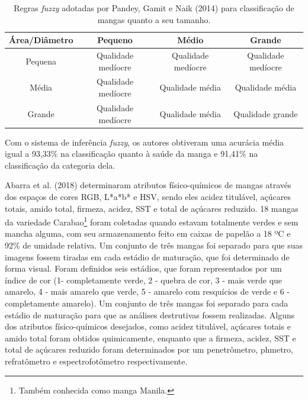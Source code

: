 \begin{center}
	\begin{table}[!htb]
	\caption{\label{tab:artigo_fuzzy} Regras \textit{fuzzy} adotadas por Pandey, Gamit e Naik (2014) para classificação de mangas quanto a seu tamanho.}
		\begin{tabular}{cccc}
			\hline
			Área/Diâmetro & Pequeno            & Médio              & Grande             \\ \hline
			Pequena       & Qualidade medíocre & Qualidade medíocre & Qualidade medíocre \\	\hline
			Média         & Qualidade medíocre & Qualidade média    & Qualidade média    \\ \hline
			Grande        & Qualidade medíocre & Qualidade média    & Qualidade grande  \\
			\hline
		\end{tabular}
	\end{table}
\end{center}

Com o sistema de inferência \textit{fuzzy}, os autores obtiveram uma acurácia média igual a 93,33\% na classificação quanto à saúde da manga e 91,41\% na classificação da categoria dela.

Abarra et al. (2018) determinaram atributos físico-químicos de mangas através dos espaços de cores RGB, L*a*b* e HSV, sendo eles acidez titulável, açúcares totais, amido total, firmeza, acidez, SST e total de açúcares reduzido. 18 mangas da variedade Carabao\footnote{\label{ftnote:Carabao}Também conhecida como manga Manila.} foram coletadas quando estavam totalmente verdes e sem mancha alguma, com seu armazenamento feito em caixas de papelão a 18 ºC e 92\% de umidade relativa. Um conjunto de três mangas foi separado para que suas imagens fossem tiradas em cada estádio de maturação, que foi determinado de forma visual. Foram definidos seis estádios, que foram representados por um índice de cor (1- completamente verde, 2 - quebra de cor, 3 - mais verde que amarelo, 4 - mais amarelo que verde, 5 - amarelo com resquícios de verde e 6 - completamente amarelo). Um conjunto de três mangas foi separado para cada estádio de maturação para que as análises destrutivas fossem realizadas. Alguns dos atributos físico-químicos desejados, como acidez titulável, açúcares totais e amido total foram obtidos quimicamente, enquanto que a firmeza, acidez, SST e total de açúcares reduzido foram determinados por um penetrômetro, phmetro, refratômetro e espectrofotômetro respectivamente. 

